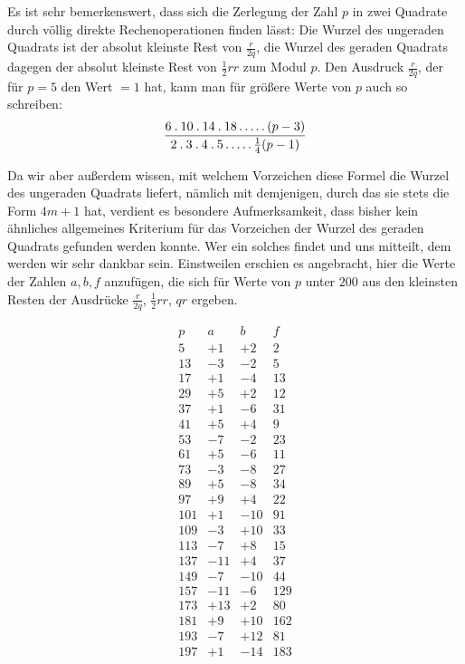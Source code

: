 Es ist sehr bemerkenswert, dass sich die Zerlegung der Zahl $p$ in zwei Quadrate durch völlig direkte Rechenoperationen finden lässt: Die Wurzel des ungeraden Quadrats ist der absolut kleinste Rest von $\frac r{2q}$, die Wurzel des geraden Quadrats dagegen der absolut kleinste Rest von $\frac12rr$ zum Modul $p$. Den Ausdruck $\frac r{2q}$, der für $p=5$ den Wert $=1$ hat, kann man für größere Werte von $p$ auch so schreiben:
\[
\frac{6\mathbin{.}10\mathbin{.}14\mathbin{.}18\mathinner{.\,.\,.\,.\,.}(p-3)}{2\mathbin{.}3\mathbin{.}4\mathbin{.}5\mathinner{.\,.\,.\,.\,.}\frac14(p-1)}
\]

Da wir aber außerdem wissen, mit welchem Vorzeichen diese Formel die Wurzel des ungeraden Quadrats liefert, nämlich mit demjenigen, durch das sie stets die Form $4m+1$ hat, verdient es besondere Aufmerksamkeit, dass bisher kein ähnliches allgemeines Kriterium für das Vorzeichen der Wurzel des geraden Quadrats gefunden werden konnte. Wer ein solches findet und uns mitteilt, dem werden wir sehr dankbar sein. Einstweilen erschien es angebracht, hier die Werte der Zahlen $a,b,f$ anzufügen, die sich für Werte von $p$ unter $200$ aus den kleinsten Resten der Ausdrücke $\frac r{2q}$, $\frac12rr$, $qr$ ergeben.

%
\[
\begin{array}{r|r|r|r}
p&a&b&f\\\hline
5&+1&+2&2\\
13&-3&-2&5\\
17&+1&-4&13\\
29&+5&+2&12\\
37&+1&-6&31\\
41&+5&+4&9\\
53&-7&-2&23\\
61&+5&-6&11\\
73&-3&-8&27\\
89&+5&-8&34\\
97&+9&+4&22\\
101&+1&-10&91\\
109&-3&+10&33\\
113&-7&+8&15\\
137&-11&+4&37\\
149&-7&-10&44\\
157&-11&-6&129\\
173&+13&+2&80\\
181&+9&+10&162\\
193&-7&+12&81\\
197&+1&-14&183
\end{array}
\]

